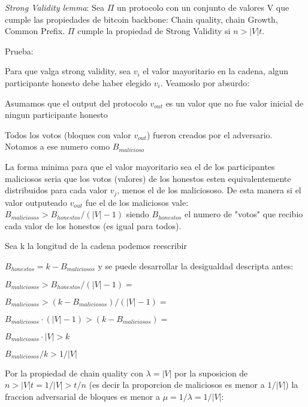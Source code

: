 \documentclass[12pt,addpoints,answers]{exam}
\begin{document}
\begin{questions}
\begin{parts}
    \begin{solution} %
        \textit{Strong Validity lemma}: Sea $\Pi$ un protocolo con un conjunto de valores V que cumple las propiedades de
        bitcoin backbone: Chain quality, chain Growth, Common Prefix. $\Pi$ cumple la propiedad de Strong Validity 
         si $n > |V| t$.
        
        Prueba:

        Para que valga strong validity, sea $v_i$ el valor mayoritario en la cadena, algun participante honesto debe 
        haber elegido $v_i$. Veamoslo por absurdo:

        \begin{enumerate}
            \item{Asumamos que el output del protocolo $v_{out}$ es un valor que no fue valor inicial de ningun participante honesto}
            \item{Todos los votos (bloques con valor $v_{out}$) fueron creados por el adversario. Notamos a ese numero como $B_{malicioso}$}
            \item {La forma minima para que el valor mayoritario sea el de los participantes maliciosos seria que los votos (valores) de
            los honestos esten equivalentemente distribuidos para cada valor $v_j$, menos el de los maliciososo. 
            De esta manera si el valor outputeado $v_{out}$ fue el de los maliciosos vale: 
            $B_{maliciosos} > B_{honestos} / (|V| - 1)$} siendo $B_{honestos}$ el numero de "votos" que recibio cada valor de los honestos
            (es igual para todos).
            \item{Sea k la longitud de la cadena podemos reescribir 
            
            $B_{honestos} = k - B_{maliciosos}$ y se puede desarrollar la desigualdad descripta antes:

            $B_{maliciosos} > B_{honestos} / (|V| - 1) = $
            
            $B_{maliciosos} > (k - B_{maliciosos}) / (|V| - 1) = $

            $B_{maliciosos} \cdot (|V| - 1) > (k - B_{maliciosos}) = $

            $B_{maliciosos} \cdot |V|> k$

            $B_{maliciosos} / k > 1 / |V|$

            \item{Por la propiedad de chain quality con $\lambda = |V|$ por la suposicion de $n > |V| t = 1 / |V| > t/n$ (es
            decir la proporcion de maliciosos es menor a $1/|V|$) la fraccion adversarial de bloques es menor a 
            $\mu = 1 / \lambda =  1 / |V|$:

}}
\end{enumerate}
\end{solution}
\end{parts}
\end{questions}
\end{document}
